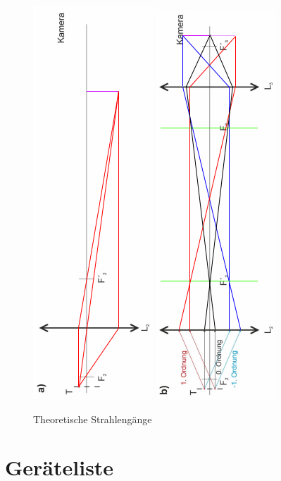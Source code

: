 \documentclass[12pt,a4paper,twoside]{article}
\begin{document}
\begin{figure}[H]
    \centering
    \includegraphics[width=0.2\linewidth, angle=-90]{nudes/Strahlenganga.png}
    \includegraphics[width=0.2\linewidth, angle=-90]{nudes/Strahlengangb.png}
    \caption{Theoretische Strahlengänge}
    \label{fig:theorStrahlengang}
\end{figure}

\section{Geräteliste} %
\end{document}
